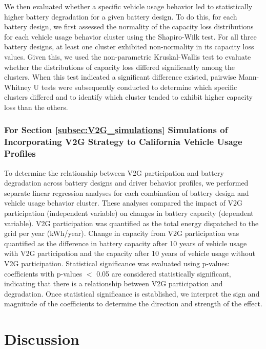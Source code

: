 \documentclass[pdflatex,sn-nature]{sn-jnl}%
\theoremstyle{thmstyleone}%
\theoremstyle{thmstyletwo}%
\theoremstyle{thmstylethree}%
\begin{document}
We then evaluated whether a specific vehicle usage behavior led to statistically higher battery degradation for a given battery design. To do this, for each battery design, we first assessed the normality of the capacity loss distributions for each vehicle usage behavior cluster using the Shapiro-Wilk test. For all three battery designs, at least one cluster exhibited non-normality in its capacity loss values. Given this, we used the non-parametric Kruskal-Wallis test to evaluate whether the distributions of capacity loss differed significantly among the clusters. When this test indicated a significant difference existed, pairwise Mann-Whitney U tests were subsequently conducted to determine which specific clusters differed and to identify which cluster tended to exhibit higher capacity loss than the others.

\subsubsection{For Section \ref{subsec:V2G_simulations} Simulations of Incorporating V2G Strategy to California Vehicle Usage Profiles}

To determine the relationship between V2G participation and battery degradation across battery designs and driver behavior profiles, 
we performed separate linear regression analyses for each combination of battery design and vehicle usage behavior cluster. These analyses compared the impact of V2G participation (independent variable) on changes in battery capacity (dependent variable). V2G participation was quantified as the total energy dispatched to the grid per year (kWh/year). Change in capacity from V2G participation was quantified as the difference in battery capacity after 10 years of vehicle usage with V2G participation and the capacity after 10 years of vehicle usage without V2G participation. Statistical significance was evaluated using p-values: coefficients with p-values $<$ 0.05 are considered statistically significant, indicating that there is a relationship between V2G participation and degradation. Once statistical significance is established, we interpret the sign and magnitude of the coefficients to determine the direction and strength of the effect. 



\section{Discussion}\label{sec12}
\end{document}
